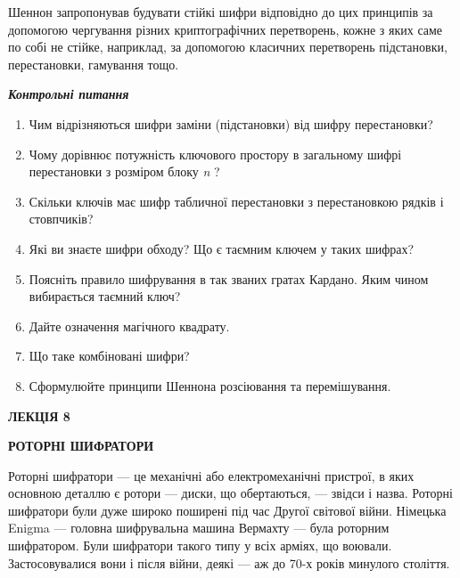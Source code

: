  Шеннон запропонував будувати стійкі шифри відповідно до цих принципів за
допомогою чергування різних криптографічних перетворень, кожне з яких саме по
собі не стійке, наприклад, за допомогою класичних перетворень підстановки,
перестановки, гамування тощо.


\bigskip


\bigskip

{\centering\bfseries\itshape
Контрольні питання
\par}


\bigskip


\bigskip

\liststyleWWviiiNumxvii
\begin{enumerate}
\item Чим відрізняються шифри заміни (підстановки) від шифру перестановки?
\item Чому дорівнює потужність ключового простору в загальному шифрі
перестановки з розміром блоку \textit{n}\textit{ }?
\item Скільки ключів має шифр табличної перестановки з перестановкою рядків і
стовпчиків? 
\item Які ви знаєте шифри обходу? Що є таємним ключем у таких шифрах?
\item Поясніть правило шифрування в так званих гратах Кардано. Яким чином
вибирається таємний ключ?
\item Дайте означення магічного квадрату.
\item Що таке комбіновані шифри?
\item Сформулюйте принципи Шеннона розсіювання  та перемішування. 
\end{enumerate}

\bigskip


\bigskip


\bigskip


\bigskip


\bigskip

{\bfseries
ЛЕКЦІЯ  8}


\bigskip

{\centering\bfseries
РОТОРНІ  ШИФРАТОРИ
\par}


\bigskip


\bigskip

Роторні шифратори  ---  це механічні або електромеханічні пристрої, в яких
основною деталлю є ротори  ---  диски, що обертаються, ---  звідси і назва. Роторні
шифратори були дуже широко поширені під час Другої світової війни. Німецька
Enigma --- головна шифрувальна машина Вермахту --- була роторним шифратором. Були
шифратори такого типу у всіх арміях, що воювали. Застосовувалися вони і після
війни, деякі --- аж до 70-х років минулого століття.

